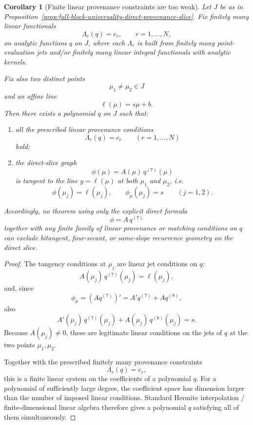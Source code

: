 \documentclass[11pt,a4paper]{amsart}
\theoremstyle{plain}
\newtheorem{corollary}[theorem]{Corollary}
\theoremstyle{definition}
\begin{document}
\begin{corollary}[Finite linear provenance constraints are too weak]
\label{cor:finite-linear-provenance-too-weak}
Let $J$ be as in
Proposition~\ref{prop:full-block-universality-direct-provenance-slice}.
Fix finitely many linear functionals
\[
\Lambda_r(q)=c_r,
\qquad r=1,\dots,N,
\]
on analytic functions $q$ on $J$, where each $\Lambda_r$ is built from finitely
many point-evaluation jets and/or finitely many linear integral functionals
with analytic kernels.

Fix also two distinct points
\[
\mu_1\neq \mu_2\in J
\]
and an affine line
\[
\ell(\mu)=s\mu+b.
\]
Then there exists a polynomial $q$ on $J$ such that:

\begin{enumerate}
\item all the prescribed linear provenance conditions
\[
\Lambda_r(q)=c_r
\qquad (r=1,\dots,N)
\]
hold;

\item the direct-slice graph
\[
\phi(\mu)=A(\mu)\,q^{(7)}(\mu)
\]
is tangent to the line $y=\ell(\mu)$ at both $\mu_1$ and $\mu_2$, i.e.
\[
\phi(\mu_j)=\ell(\mu_j),
\qquad
\phi_\mu(\mu_j)=s
\qquad (j=1,2).
\]
\end{enumerate}

Accordingly, no theorem using only the explicit direct formula
\[
\phi=A\,q^{(7)}
\]
together with any finite family of linear provenance or matching conditions on
$q$ can exclude bitangent, four-secant, or same-slope recurrence geometry on
the direct slice.
\end{corollary}

\begin{proof}
The tangency conditions at $\mu_j$ are linear jet conditions on $q$:
\[
A(\mu_j)\,q^{(7)}(\mu_j)=\ell(\mu_j),
\]
and, since
\[
\phi_\mu=(Aq^{(7)})'=A' q^{(7)}+A q^{(8)},
\]
also
\[
A'(\mu_j)\,q^{(7)}(\mu_j)+A(\mu_j)\,q^{(8)}(\mu_j)=s.
\]
Because $A(\mu_j)\neq 0$, these are legitimate linear conditions on the jets of
$q$ at the two points $\mu_1,\mu_2$.

Together with the prescribed finitely many provenance constraints
\[
\Lambda_r(q)=c_r,
\]
this is a finite linear system on the coefficients of a polynomial $q$. For a
polynomial of sufficiently large degree, the coefficient space has dimension
larger than the number of imposed linear conditions. Standard Hermite
interpolation / finite-dimensional linear algebra therefore gives a polynomial
$q$ satisfying all of them simultaneously.
\end{proof}
\end{document}
